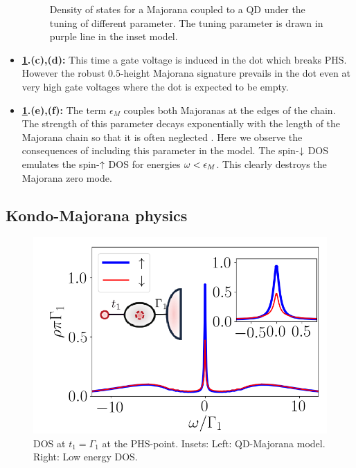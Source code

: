 \begin{itemize}
\begin{figure}[h]
     \caption{Density of states for a Majorana coupled to a QD under the tuning of different parameter. The tuning parameter is drawn in purple line in the inset model.  \label{fig:M1-Tot} \protect{}}
\end{figure}

  
    \item\textbf{ \ref{fig:M1-Tot}.(c),(d):} This time a gate voltage is induced in the dot which breaks PHS. However the robust $0.5$-height Majorana signature prevails in the dot even at very high gate voltages where the dot is expected to be empty.
    
    \item\textbf{ \ref{fig:M1-Tot}.(e),(f):} The term $\epsilon_M$ couples both Majoranas at the edges of the chain. The strength of this parameter decays exponentially with the length of the Majorana  chain so that it is often neglected . Here we observe the consequences of including this parameter in the model. The spin-$\downarrow$ DOS emulates the spin-$\uparrow$ DOS for energies $\omega < \epsilon_M$. This clearly destroys the Majorana zero mode.   
\end{itemize}







\subsection{Kondo-Majorana physics}
\begin{figure}[t]
\centering
\includegraphics[scale=0.5]{IMAGES/Majorana/NRG_M1.png}
\caption{ \label{fig:NRG-1M} DOS at $t_1 = \Gamma_1$ at the PHS-point.  Insets: Left: QD-Majorana model. Right: Low energy DOS. \protect{}}

\end{figure}

